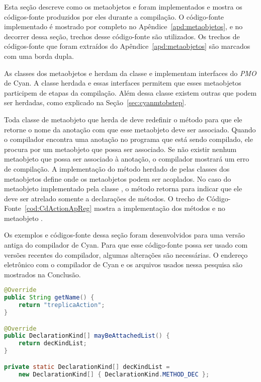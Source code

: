 Esta seção descreve como os metaobjetos  e  foram implementados e mostra os códigos-fonte produzidos por eles durante a compilação. O código-fonte implementado é mostrado por completo no Apêndice~\ref{apd:metaobjetos}, e no decorrer dessa seção, trechos desse código-fonte são utilizados. Os trechos de códigos-fonte que foram extraídos do Apêndice~\ref{apd:metaobjetos} são marcados com uma borda dupla.

As classes dos metaobjetos  e  herdam da classe  e implementam interfaces do \emph{PMO} de Cyan. A classe herdada e essas interfaces permitem que esses metaobjetos participem de etapas da compilação. Além dessa classe existem outras que podem ser herdadas, como explicado na Seção~\ref{sec:cyanmtobstep}.

Toda classe de metaobjeto que herda de  deve redefinir o método  para que ele retorne o nome da anotação com que esse metaobjeto deve ser associado. Quando o compilador encontra uma anotação no programa que está sendo compilado, ele procura por um metaobjeto que possa ser associado. Se não existir nenhum metaobjeto que possa ser associado à anotação, o compilador mostrará um erro de compilação. A implementação do método  herdado de  pelas classes dos metaobjetos define onde os metaobjetos podem ser acoplados. No caso do metaobjeto  implementado pela classe , o método  retorna  para indicar que ele deve ser atrelado somente a declarações de métodos. O trecho de Código-Fonte~\ref{cod:CdActionApReg} mostra a implementação dos métodos  e  no metaobjeto . 

Os exemplos e códigos-fonte dessa seção foram desenvolvidos para uma versão antiga do compilador de Cyan. Para que esse código-fonte possa ser usado com versões recentes do compilador, algumas alterações são necessárias. O endereço eletrônico com o compilador de Cyan e os arquivos usados nessa pesquisa são mostrados na Conclusão.

\begin{lstlisting}[language=Java, caption={Métodos de \textbf{CyanMetaobjectTreplicaAction}}, label={cod:CdActionApReg}, frame=TLBR]
@Override
public String getName() {
	return "treplicaAction";
}

@Override
public DeclarationKind[] mayBeAttachedList() {
	return decKindList;
}

private static DeclarationKind[] decKindList =
    new DeclarationKind[] { DeclarationKind.METHOD_DEC };
\end{lstlisting}


